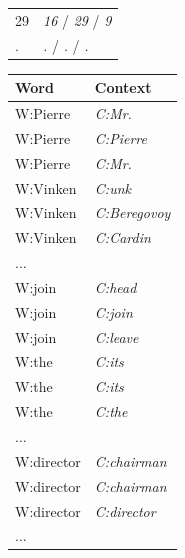 \begin{table}[ht]
\begin{tabular}{|ll|}
29 & \textit{16} /  \textit{29} / \textit{9}\\
. & \textit{.}  / \textit{.} / \textit{.}\\
\hline
\end{tabular}
\quad
\begin{tabular}{|ll|}
\hline
\textbf{Word} & \textbf{Context}\\
\hline
W:Pierre & \textit{C:Mr.}\\
W:Pierre & \textit{C:Pierre}\\
W:Pierre & \textit{C:Mr.}\\
W:Vinken & \textit{C:unk}\\
W:Vinken & \textit{C:Beregovoy}\\
W:Vinken & \textit{C:Cardin}\\
$\hdots$&\\
W:join & \textit{C:head}\\
W:join & \textit{C:join}\\
W:join & \textit{C:leave}\\
W:the & \textit{C:its}\\
W:the & \textit{C:its}\\
W:the & \textit{C:the}\\
$\hdots$&\\
W:director & \textit{C:chairman}\\
W:director & \textit{C:chairman}\\
W:director & \textit{C:director}\\
$\hdots$&\\
\hline
\end{tabular}
\label{tab:samples}
\end{table}

